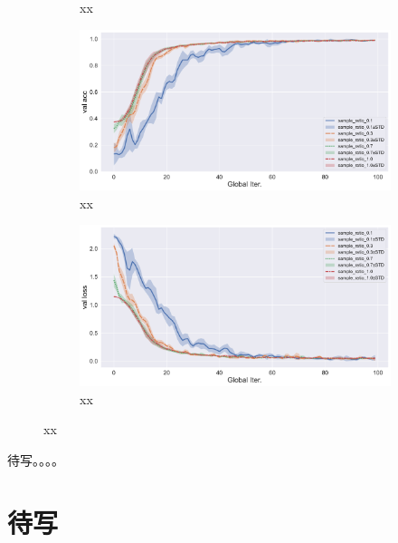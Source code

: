 \begin{figure}[ht]
\begin{subfigure}{.5\textwidth}
  \caption{xx}
  \label{fig:fedsplit-compare-sample-ratio-val-loss}
\end{subfigure}
\begin{subfigure}{.5\textwidth}
  \centering
  \includegraphics[width=.95\linewidth]{figures/ifca-compare-sample-ratio-val-acc.pdf}
  \caption{xx}
  \label{fig:ifca-compare-sample-ratio-val-acc}
\end{subfigure}%
\begin{subfigure}{.5\textwidth}
  \centering
  \includegraphics[width=.95\linewidth]{figures/ifca-compare-sample-ratio-val-loss.pdf}
  \caption{xx}
  \label{fig:ifca-compare-sample-ratio-val-loss}
\end{subfigure}
\caption{xx}
\label{fig:fedprox-compare-sample-ratio}
\end{figure}



待写。。。。

\section{待写}
\label{sec:chap6-lr}


